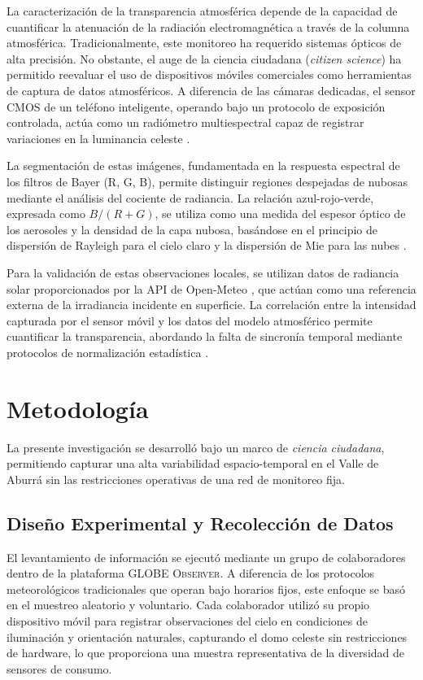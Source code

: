 \documentclass[twocolumn]{aastex701}
\begin{document}
La caracterización de la transparencia atmosférica depende de la capacidad de cuantificar la atenuación de la radiación electromagnética a través de la columna atmosférica. Tradicionalmente, este monitoreo ha requerido sistemas ópticos de alta precisión. No obstante, el auge de la ciencia ciudadana (\textit{citizen science}) ha permitido reevaluar el uso de dispositivos móviles comerciales como herramientas de captura de datos atmosféricos. A diferencia de las cámaras dedicadas, el sensor CMOS de un teléfono inteligente, operando bajo un protocolo de exposición controlada, actúa como un radiómetro multiespectral capaz de registrar variaciones en la luminancia celeste \citep{Hager2015}.

La segmentación de estas imágenes, fundamentada en la respuesta espectral de los filtros de Bayer (R, G, B), permite distinguir regiones despejadas de nubosas mediante el análisis del cociente de radiancia. La relación azul-rojo-verde, expresada como $B/(R+G)$, se utiliza como una medida del espesor óptico de los aerosoles y la densidad de la capa nubosa, basándose en el principio de dispersión de Rayleigh para el cielo claro y la dispersión de Mie para las nubes \citep{Shields2013}.

Para la validación de estas observaciones locales, se utilizan datos de radiancia solar proporcionados por la API de Open-Meteo \citep{OpenMeteo2026}, que actúan como una referencia externa de la irradiancia incidente en superficie. La correlación entre la intensidad capturada por el sensor móvil y los datos del modelo atmosférico permite cuantificar la transparencia, abordando la falta de sincronía temporal mediante protocolos de normalización estadística \citep{Liou2002}.

\section{Metodología} \label{sec:metodología}

La presente investigación se desarrolló bajo un marco de \textit{ciencia ciudadana}, permitiendo capturar una alta variabilidad espacio-temporal en el Valle de Aburrá sin las restricciones operativas de una red de monitoreo fija.

\subsection{Diseño Experimental y Recolección de Datos}
El levantamiento de información se ejecutó mediante un grupo de colaboradores dentro de la plataforma \textsc{GLOBE Observer}. A diferencia de los protocolos meteorológicos tradicionales que operan bajo horarios fijos, este enfoque se basó en el muestreo aleatorio y voluntario. Cada colaborador utilizó su propio dispositivo móvil para registrar observaciones del cielo en condiciones de iluminación y orientación naturales, capturando el domo celeste sin restricciones de hardware, lo que proporciona una muestra representativa de la diversidad de sensores de consumo.
\end{document}

